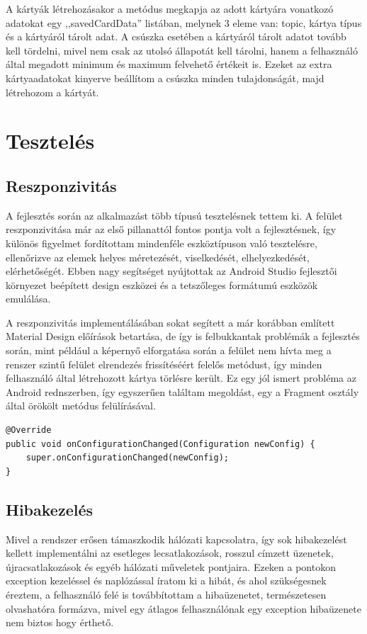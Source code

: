 \documentclass[
]{thesis-ekf}
\theoremstyle{definition}
\theoremstyle{remark}
\begin{document}
A kártyák létrehozásakor a metódus megkapja az adott kártyára vonatkozó adatokat egy ,,savedCardData'' listában, melynek
3 eleme van: topic, kártya típus és a kártyáról tárolt adat. A csúszka esetében a kártyáról tárolt adatot tovább kell tördelni,
mivel nem csak az utolsó állapotát kell tárolni, hanem a felhasználó által megadott minimum és maximum felvehető értékeit is.
Ezeket az extra kártyaadatokat kinyerve beállítom a csúszka minden tulajdonságát, majd létrehozom a kártyát.

\section{Tesztelés}

\subsection{Reszponzivitás}
A fejlesztés során az alkalmazást több típusú tesztelésnek tettem ki. A felület reszponzivitása már az első pillanattól
fontos pontja volt a fejlesztésnek, így különös figyelmet fordítottam mindenféle eszköztípuson való tesztelésre, ellenőrizve
az elemek helyes méretezését, viselkedését, elhelyezkedését, elérhetőségét. Ebben nagy segítséget nyújtottak az 
Android Studio fejlesztői környezet beépített design eszközei és a tetszőleges formátumú eszközök emulálása. 

A reszponzivitás implementálásában sokat segített a már korábban említett Material Design\cite{material} előírások betartása,
de így is felbukkantak problémák a fejlesztés során, mint például a képernyő elforgatása során a felület 
nem hívta meg a renszer szintű felület elrendezés frissítéséért felelős metódust, 
így minden felhasználó által létrehozott kártya törlésre került. Ez egy jól ismert probléma az Android rednszerben, 
így egyszerűen találtam megoldást, egy a Fragment osztály által örökölt metódus felülírásával.

\lstset{language=Java}  
\begin{lstlisting}[frame=single]
@Override
public void onConfigurationChanged(Configuration newConfig) {
	super.onConfigurationChanged(newConfig);
}
\end{lstlisting}
\subsection{Hibakezelés}
Mivel a rendszer erősen támaszkodik hálózati kapcsolatra, így sok hibakezelést kellett implementálni az esetleges
lecsatlakozások, rosszul címzett üzenetek, újracsatlakozások és egyéb hálózati műveletek pontjaira. Ezeken a pontokon
exception kezeléssel és naplózással íratom ki a hibát, és ahol szükségesnek éreztem, a felhasználó felé is továbbítottam
a hibaüzenetet, természetesen olvashatóra formázva, mivel egy átlagos felhasználónak egy exception hibaüzenete
nem biztos hogy érthető. 
\end{document}
